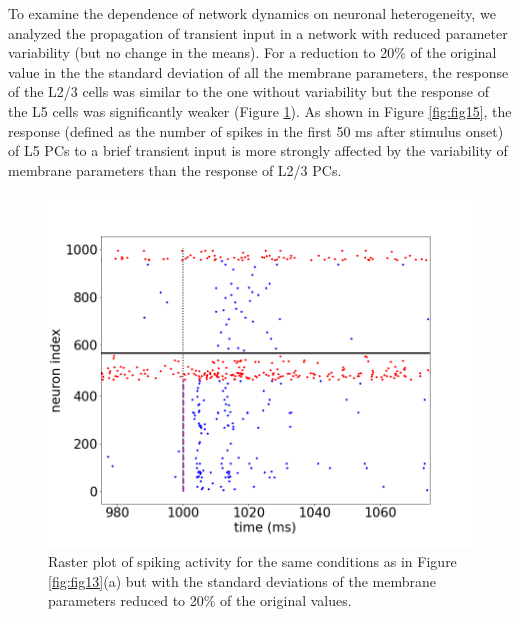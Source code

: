 To examine the dependence of network dynamics on neuronal heterogeneity, we analyzed the propagation of transient input in a network with reduced  parameter variability (but no change in the means). For a reduction to 20\% of the original value in the the standard deviation of all the membrane parameters, the response of the L2/3 cells was similar to the one without variability but the response of the L5 cells was significantly weaker (Figure \ref{fig:fig14}). As shown in Figure \ref{fig:fig15}, the response (defined as the number of spikes in the first 50 ms after stimulus onset) of L5 PCs to a brief transient input is more strongly affected by the variability of membrane parameters than the response of L2/3 PCs. \\

\begin{figure}[H]
    \centering
    \includegraphics[scale=0.25]{Figures/Fig14.png}
    \caption{Raster plot of spiking activity for the same conditions as in Figure \ref{fig:fig13}(a) but with the standard deviations of the membrane parameters reduced to 20\% of the original values.}
    \label{fig:fig14}
\end{figure}

